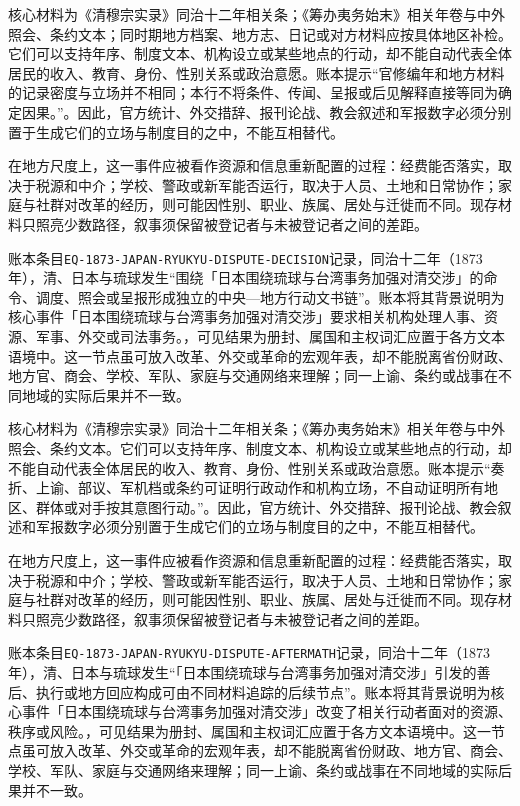 核心材料为《清穆宗实录》同治十二年相关条；《筹办夷务始末》相关年卷与中外照会、条约文本；同时期地方档案、地方志、日记或对方材料应按具体地区补检。它们可以支持年序、制度文本、机构设立或某些地点的行动，却不能自动代表全体居民的收入、教育、身份、性别关系或政治意愿。账本提示“官修编年和地方材料的记录密度与立场并不相同；本行不将条件、传闻、呈报或后见解释直接等同为确定因果。”。因此，官方统计、外交措辞、报刊论战、教会叙述和军报数字必须分别置于生成它们的立场与制度目的之中，不能互相替代。

在地方尺度上，这一事件应被看作资源和信息重新配置的过程：经费能否落实，取决于税源和中介；学校、警政或新军能否运行，取决于人员、土地和日常协作；家庭与社群对改革的经历，则可能因性别、职业、族属、居处与迁徙而不同。现存材料只照亮少数路径，叙事须保留被登记者与未被登记者之间的差距。

账本条目\texttt{EQ-1873-JAPAN-RYUKYU-DISPUTE-DECISION}记录，同治十二年（1873年），清、日本与琉球发生“围绕「日本围绕琉球与台湾事务加强对清交涉」的命令、调度、照会或呈报形成独立的中央—地方行动文书链”。账本将其背景说明为核心事件「日本围绕琉球与台湾事务加强对清交涉」要求相关机构处理人事、资源、军事、外交或司法事务。，可见结果为册封、属国和主权词汇应置于各方文本语境中。这一节点虽可放入改革、外交或革命的宏观年表，却不能脱离省份财政、地方官、商会、学校、军队、家庭与交通网络来理解；同一上谕、条约或战事在不同地域的实际后果并不一致。

核心材料为《清穆宗实录》同治十二年相关条；《筹办夷务始末》相关年卷与中外照会、条约文本。它们可以支持年序、制度文本、机构设立或某些地点的行动，却不能自动代表全体居民的收入、教育、身份、性别关系或政治意愿。账本提示“奏折、上谕、部议、军机档或条约可证明行政动作和机构立场，不自动证明所有地区、群体或对手按其意图行动。”。因此，官方统计、外交措辞、报刊论战、教会叙述和军报数字必须分别置于生成它们的立场与制度目的之中，不能互相替代。

在地方尺度上，这一事件应被看作资源和信息重新配置的过程：经费能否落实，取决于税源和中介；学校、警政或新军能否运行，取决于人员、土地和日常协作；家庭与社群对改革的经历，则可能因性别、职业、族属、居处与迁徙而不同。现存材料只照亮少数路径，叙事须保留被登记者与未被登记者之间的差距。

账本条目\texttt{EQ-1873-JAPAN-RYUKYU-DISPUTE-AFTERMATH}记录，同治十二年（1873年），清、日本与琉球发生“「日本围绕琉球与台湾事务加强对清交涉」引发的善后、执行或地方回应构成可由不同材料追踪的后续节点”。账本将其背景说明为核心事件「日本围绕琉球与台湾事务加强对清交涉」改变了相关行动者面对的资源、秩序或风险。，可见结果为册封、属国和主权词汇应置于各方文本语境中。这一节点虽可放入改革、外交或革命的宏观年表，却不能脱离省份财政、地方官、商会、学校、军队、家庭与交通网络来理解；同一上谕、条约或战事在不同地域的实际后果并不一致。


